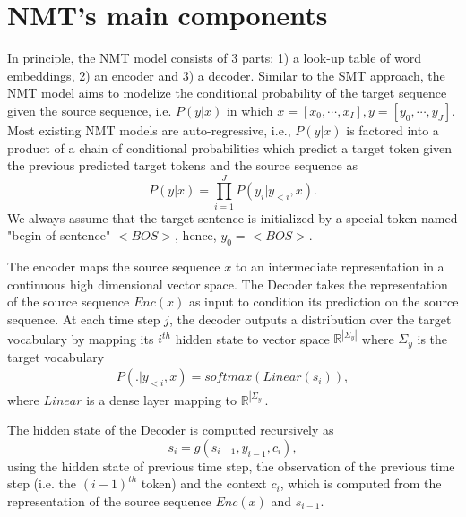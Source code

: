 \section{NMT's main components}
In principle, the NMT model consists of 3 parts: 1) a look-up table of word embeddings, 2) an encoder and 3) a decoder. Similar to the SMT approach, the NMT model aims to modelize the conditional probability of the target sequence given the source sequence, i.e. $P(y|x)$ in which $x=[x_0,\cdots,x_{I}], y=[y_0,\cdots,y_{J}]$. Most existing NMT models are auto-regressive, i.e., $P(y|x)$ is factored into a product of a chain of conditional probabilities which predict a target token given the previous predicted target tokens and the source sequence as
\begin{equation}
P(y|x) = \displaystyle{\mathop{\prod}_{i=1}^{J}} P(y_i|y_{<i},x).
\end{equation}
We always assume that the target sentence is initialized by a special token named "begin-of-sentence" $<BOS>$, hence, $y_{0}=<BOS>$. 

The encoder maps the source sequence $x$ to an intermediate representation in a continuous high dimensional vector space. The Decoder takes the representation of the source sequence $Enc(x)$ as input to condition its prediction on the source sequence. At each time step $j$, the decoder outputs a distribution over the target vocabulary by mapping its $i^{th}$ hidden state to vector space $\mathbb{R}^{|\Sigma_y|}$ where $\Sigma_y$ is the target vocabulary
\begin{equation}
\begin{array}{rcl}
P(.|y_{<i},x) = softmax(Linear(s_i)),
\end{array}
\end{equation}
where $Linear$ is a dense layer mapping to $\mathbb{R}^{|\Sigma_y|}$.

The hidden state of the Decoder is computed recursively as 
\begin{equation}
s_i = g(s_{i-1},y_{i-1},c_i),
\end{equation}
using the hidden state of previous time step, the observation of the previous time step (i.e. the $(i-1)^{th}$ token) and the context $c_i$, which is computed from the representation of the source sequence $Enc(x)$ and $s_{i-1}$.

